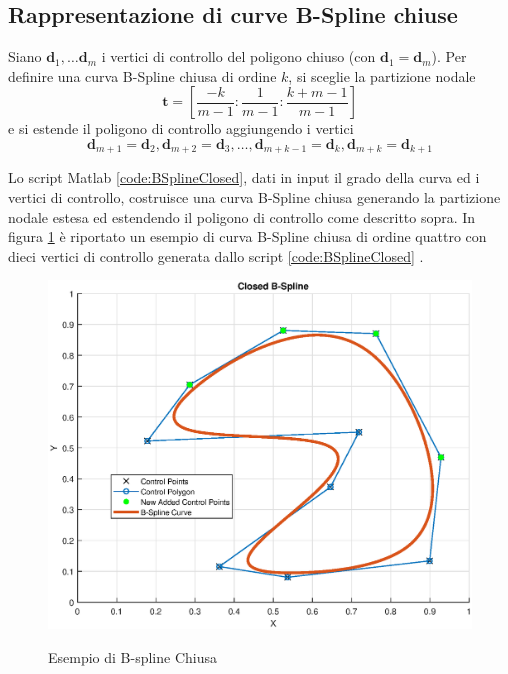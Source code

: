 \documentclass[a4paper, 12pt]{article}
\begin{document}


\subsection{Rappresentazione di curve B-Spline chiuse}
Siano $\mathbf{d}_1,\dots \mathbf{d}_m$ i vertici di controllo del poligono chiuso (con $\mathbf{d}_1 = \mathbf{d}_m$). 
Per definire una curva B-Spline chiusa di ordine $k$, si sceglie la partizione nodale $$\mathbf{t} = \left[ \frac{-k}{m-1} : \frac{1}{m-1} : \frac{k+m-1}{m-1} \right]$$
e si estende il poligono di controllo  aggiungendo i vertici $$\mathbf{d}_{m+1} = \mathbf{d}_2,\mathbf{d}_{m+2} = \mathbf{d}_3, \dots, \mathbf{d}_{m+k-1} = \mathbf{d}_k, \mathbf{d}_{m+k} = \mathbf{d}_{k+1} $$

Lo script Matlab \ref{code:BSplineClosed}, dati in input il grado della curva ed i vertici di controllo, costruisce una curva B-Spline chiusa generando la partizione nodale estesa ed estendendo il poligono di controllo come descritto sopra. In figura \ref{fig:BSplineClosed} è riportato un esempio di curva B-Spline chiusa di ordine quattro con dieci vertici di controllo generata dallo script \ref{code:BSplineClosed} .



\begin{figure}[h!]
	\centering
	\caption{Esempio di B-spline Chiusa}
	\includegraphics[scale=0.6]{closed_plot.eps}
	\label{fig:BSplineClosed}
\end{figure}
\end{document}
